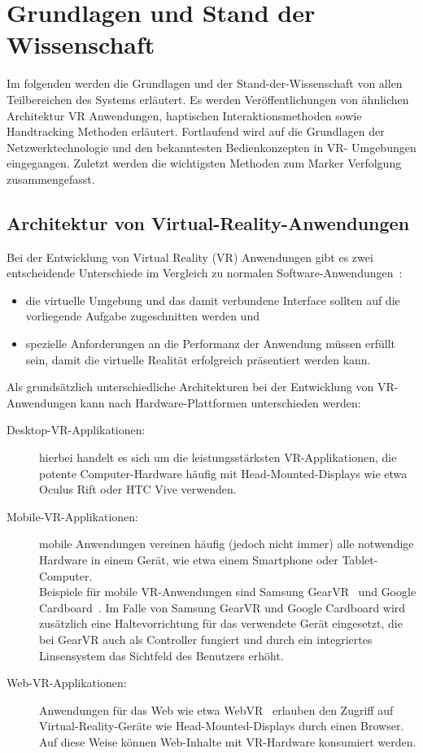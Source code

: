 \section{Grundlagen und Stand der Wissenschaft}
Im folgenden werden die Grundlagen und der Stand-der-Wissenschaft von allen Teilbereichen des  Systems erläutert. Es werden Veröffentlichungen von ähnlichen Architektur VR Anwendungen, haptischen Interaktionsmethoden sowie Handtracking Methoden erläutert. Fortlaufend wird auf die Grundlagen der Netzwerktechnologie und den bekanntesten Bedienkonzepten in VR- Umgebungen eingegangen. Zuletzt werden die wichtigsten Methoden zum Marker Verfolgung zusammengefasst.
\subsection{Architektur von Virtual-Reality-Anwendungen}\label{sec:ArchitekturAnwendungen}
Bei der Entwicklung von Virtual Reality (VR) Anwendungen gibt es zwei entscheidende Unterschiede im Vergleich zu normalen Software-Anwendungen~\cite{bryson1995approaches}:
\begin{itemize}
	\item die virtuelle Umgebung und das damit verbundene Interface sollten auf die vorliegende Aufgabe zugeschnitten werden und
	\item spezielle Anforderungen an die Performanz der Anwendung müssen erfüllt sein, damit die virtuelle Realität erfolgreich präsentiert werden kann.
\end{itemize}

Als grundsätzlich unterschiedliche Architekturen bei der Entwicklung von VR-An\-wen\-dung\-en kann nach Hardware-Plattformen unterschieden werden:
\begin{description}
	\item[Desktop-VR-Applikationen:] hierbei handelt es sich um die leistungsstärksten VR-Applikationen, die potente Computer-Hardware häufig mit Head-Mounted-Displays wie etwa Oculus Rift oder HTC Vive verwenden.
	\item[Mobile-VR-Applikationen:] mobile Anwendungen vereinen häufig (jedoch nicht immer) alle notwendige Hardware in einem Gerät, wie etwa einem Smartphone oder Tablet-Computer.\\ Beispiele für mobile VR-Anwendungen sind Samsung GearVR~\cite{website:gearVRpressRelease} und Google Cardboard~\cite{website:googleCardboard}. Im Falle von Samsung GearVR und Google Cardboard wird zusätzlich eine Haltevorrichtung für das verwendete Gerät eingesetzt, die bei GearVR auch als Controller fungiert und durch ein integriertes Linsensystem das Sichtfeld des Benutzers erhöht.
	\item[Web-VR-Applikationen:] Anwendungen für das Web wie etwa WebVR~\cite{website:webVR} erlauben den Zugriff auf Virtual-Reality-Geräte wie Head-Mounted-Displays durch einen Browser. Auf diese Weise können Web-Inhalte mit VR-Hardware konsumiert werden.
\end{description}

